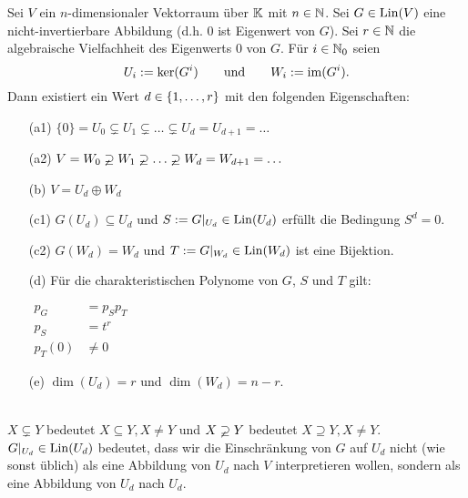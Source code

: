 \begin{lm}
	Sei $ V $ ein $ n $-dimensionaler Vektorraum über $ \mathbb K $ mit $ n \in \mathbb N $. Sei $ G \in \operatorname{Lin}(V) $ eine nicht-invertierbare Abbildung (d.h. 0 ist Eigenwert von $ G $). Sei $ r \in \mathbb N $ die algebraische Vielfachheit des Eigenwerts 0 von $ G $. Für $ i \in \mathbb N_0 $ seien
	\begin{equation*}
		U_i := \ker(G^i) \qquad\text{und}\qquad W_i := \operatorname{im}(G^i).
	\end{equation*}
	Dann existiert ein Wert $ d \in \{ 1,\ldots,r \} $ mit den folgenden Eigenschaften:
	\begin{itemize}[font=\normalfont]
		\item[(a1)]
		$ \{ 0 \} = U_0 \varsubsetneq U_1 \varsubsetneq \ldots \varsubsetneq U_d = U_{d+1} = \ldots $
		\item[(a2)]
		$ V = W_0 \varsupsetneq W_1 \varsupsetneq \ldots \varsupsetneq W_d = W_{d+1} = \ldots $
		\item[(b)]
		$ V = U_d \oplus W_d $
		\item[(c1)]
		$ G(U_d) \subseteq U_d $ und $ S := G|_{U_d} \in \operatorname{Lin}(U_d) $ erfüllt die Bedingung $ S^d = 0 $.
		\item[(c2)]
		$ G(W_d) = W_d $ und $ T := G|_{W_d} \in \operatorname{Lin}(W_d) $ ist eine Bijektion.
		\item[(d)]
		Für die charakteristischen Polynome von $ G $, $ S $ und $ T $ gilt:
		
		$ \begin{aligned}
			p_G &= p_S p_T \\
			p_S &= t^r \\
			p_T(0) &\neq 0
		\end{aligned} $
		\item[(e)]
		$ \dim(U_d) = r $ und $ \dim(W_d) = n-r $.
	\end{itemize}
\end{lm}
\begin{bem}\ \\
	$ X \varsubsetneq Y $ bedeutet $ X \subseteq Y, X \neq Y $ und $ X \varsupsetneq Y $ bedeutet $ X \supseteq Y, X \neq Y $. \\
	$ G|_{U_d} \in \operatorname{Lin}(U_d) $ bedeutet, dass wir die Einschränkung von $ G $ auf $ U_d $ nicht (wie sonst üblich) als eine Abbildung von $ U_d $ nach $ V $ interpretieren wollen, sondern als eine Abbildung von $ U_d $ nach $ U_d $.
\end{bem}
